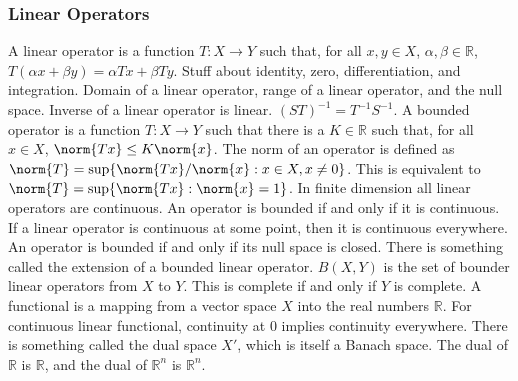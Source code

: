 \documentclass[crop=false,class=book,oneside]{standalone}
\begin{document}
            \subsubsection{Linear Operators}
                A linear operator is a function
                $T:X\rightarrow{Y}$ such that, for all
                $x,y\in{X}$, $\alpha,\beta\in\mathbb{R}$,
                $T(\alpha{x}+\beta{y})=\alpha{Tx}+\beta{Ty}$.
                Stuff about identity, zero, differentiation, and
                integration. 
                Domain of a linear operator, range of a linear operator,
                and the null space.
                Inverse of a linear operator is linear.
                $(ST)^{-1}=T^{-1}S^{-1}$.
                A bounded operator is a function $T:X\rightarrow{Y}$
                such that there is a $K\in\mathbb{R}$ such that, for all
                $x\in{X}$, $\norm{Tx}\leq{K}\norm{x}$. The norm of an operator
                is defined as
                $\norm{T}=\sup\{\norm{Tx}/\norm{x}:x\in{X},x\ne{0}\}$.
                This is equivalent to
                $\norm{T}=\sup\{\norm{Tx}:\norm{x}=1\}$. In finite dimension
                all linear operators are continuous. An operator is bounded
                if and only if it is continuous. If a linear operator is
                continuous at some point, then it is continuous everywhere.
                An operator is bounded if and only if its null space is closed.
                There is something called the extension of a bounded linear
                operator. $B(X,Y)$ is the set of bounder linear operators
                from $X$ to $Y$. This is complete if and only if
                $Y$ is complete. A functional is a mapping from a vector
                space $X$ into the real numbers $\mathbb{R}$. For continuous
                linear functional, continuity at $0$ implies continuity
                everywhere. There is something called the dual space
                $X'$, which is itself a Banach space. The dual
                of $\mathbb{R}$ is $\mathbb{R}$, and the dual of
                $\mathbb{R}^{n}$ is $\mathbb{R}^{n}$.
\end{document}
